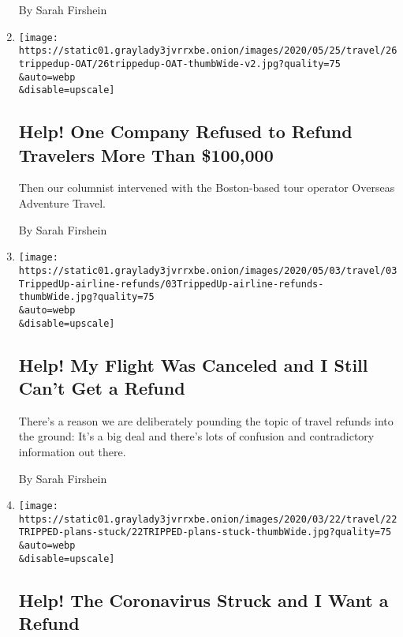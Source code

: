 \begin{enumerate}
  By Sarah Firshein
\item
  \href{/2020/05/25/travel/coronavirus-refunds-overseas-adventure-travel.html}{}

  \texttt{[image: https://static01.graylady3jvrrxbe.onion/images/2020/05/25/travel/26trippedup-OAT/26trippedup-OAT-thumbWide-v2.jpg?quality=75\\\&auto=webp\\\&disable=upscale]}

  \hypertarget{help-one-company-refused-to-refund-travelers-more-than-100000}{%
  \subsection{Help! One Company Refused to Refund Travelers More Than
  \$100,000}\label{help-one-company-refused-to-refund-travelers-more-than-100000}}

  Then our columnist intervened with the Boston-based tour operator
  Overseas Adventure Travel.

  By Sarah Firshein
\item
  \href{/2020/05/01/travel/trip-refund-airlines.html}{}

  \texttt{[image: https://static01.graylady3jvrrxbe.onion/images/2020/05/03/travel/03TrippedUp-airline-refunds/03TrippedUp-airline-refunds-thumbWide.jpg?quality=75\\\&auto=webp\\\&disable=upscale]}

  \hypertarget{help-my-flight-was-canceled-and-i-still-cant-get-a-refund}{%
  \subsection{Help! My Flight Was Canceled and I Still Can't Get a
  Refund}\label{help-my-flight-was-canceled-and-i-still-cant-get-a-refund}}

  There's a reason we are deliberately pounding the topic of travel
  refunds into the ground: It's a big deal and there's lots of confusion
  and contradictory information out there.

  By Sarah Firshein
\item
  \href{/2020/04/11/travel/coronavirus-travel-trip-refunds.html}{}

  \texttt{[image: https://static01.graylady3jvrrxbe.onion/images/2020/03/22/travel/22TRIPPED-plans-stuck/22TRIPPED-plans-stuck-thumbWide.jpg?quality=75\\\&auto=webp\\\&disable=upscale]}

  \hypertarget{help-the-coronavirus-struck-and-i-want-a-refund}{%
  \subsection{Help! The Coronavirus Struck and I Want a
  Refund}\label{help-the-coronavirus-struck-and-i-want-a-refund}}


\end{enumerate}

